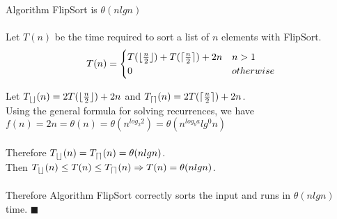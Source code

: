 \documentclass[12pt]{article}
\newenvironment{lemma}[2][Lemma]{\begin{trivlist}
\item[\hskip \labelsep {\bfseries #1}\hskip \labelsep {\bfseries #2.}]}{\end{trivlist}}
\newenvironment{question}[2][Question]{\begin{trivlist}
\item[\hskip \labelsep {\bfseries #1}\hskip \labelsep {\bfseries #2.}]}{\end{trivlist}}
\DeclarePairedDelimiter{\ceil}{\lceil}{\rceil}
\DeclarePairedDelimiter{\floor}{\lfloor}{\rfloor}
\begin{document}
\begin{question}{1 (a)}
  \begin{lemma}{1.4} Algorithm FlipSort is $\theta(nlgn)$ \\ \\
    Let $T(n)$ be the time required to sort a list of $n$ elements with FlipSort.\\
    \[
      T(n) = \begin{cases}
                T(\floor{\frac{n}{2}}) + T(\ceil{\frac{n}{2}}) + 2n & n > 1 \\
                0                                    & otherwise \\
             \end{cases}
    \]

    Let $T_{\floor{}}(n) = 2T(\floor{\frac{n}{2}}) + 2n$ and $T_{\ceil{}}(n) = 2T(\ceil{\frac{n}{2}}) + 2n$. \\
    Using the general formula for solving recurrences, we have\\
    $f(n) = 2n = \theta(n) = \theta(n^{log_{2}2}) = \theta(n^{log_{b}a}lg^{0}n)$\\ \\
    Therefore $T_{\floor{}}(n) = T_{\ceil{}}(n) = \theta(nlgn)$.\\
    Then $T_{\floor{}}(n) \leq T(n) \leq T_{\ceil{}}(n) \Rightarrow T(n) = \theta(nlgn)$. \\ \\
    Therefore Algorithm FlipSort correctly sorts the input and runs in $\theta(nlgn)$ time. $\blacksquare$
  \end{lemma}
\end{question}
\end{document}
